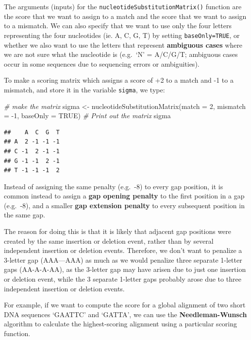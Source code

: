 \documentclass[
]{book}
\newenvironment{Shaded}{\begin{snugshade}}{\end{snugshade}}
\newcommand{\AttributeTok}[1]{\textcolor[rgb]{0.77,0.63,0.00}{#1}}
\newcommand{\CommentTok}[1]{\textcolor[rgb]{0.56,0.35,0.01}{\textit{#1}}}
\newcommand{\ConstantTok}[1]{\textcolor[rgb]{0.00,0.00,0.00}{#1}}
\newcommand{\DecValTok}[1]{\textcolor[rgb]{0.00,0.00,0.81}{#1}}
\newcommand{\FunctionTok}[1]{\textcolor[rgb]{0.00,0.00,0.00}{#1}}
\newcommand{\NormalTok}[1]{#1}
\newcommand{\OtherTok}[1]{\textcolor[rgb]{0.56,0.35,0.01}{#1}}
\newcommand{\SpecialCharTok}[1]{\textcolor[rgb]{0.00,0.00,0.00}{#1}}
\begin{document}
The arguments (inputs) for the \texttt{nucleotideSubstitutionMatrix()} function are the score that we want to assign to a match and the score that we want to assign to a mismatch. We can also specify that we want to use only the four letters representing the four nucleotides (ie. A, C, G, T) by setting \texttt{baseOnly=TRUE}, or whether we also want to use the letters that represent \textbf{ambiguous cases} where we are not sure what the nucleotide is (e.g.~`N' = A/C/G/T; ambiguous cases occur in some sequences due to sequencing errors or ambiguities).

To make a scoring matrix which assigns a score of +2 to a match and -1 to a mismatch, and store it in the variable \texttt{sigma}, we type:

\begin{Shaded}
\begin{Highlighting}[]
\CommentTok{\# make the matrix}
\NormalTok{sigma }\OtherTok{\textless{}{-}} \FunctionTok{nucleotideSubstitutionMatrix}\NormalTok{(}\AttributeTok{match =} \DecValTok{2}\NormalTok{, }
                                      \AttributeTok{mismatch =} \SpecialCharTok{{-}}\DecValTok{1}\NormalTok{, }
                                      \AttributeTok{baseOnly =} \ConstantTok{TRUE}\NormalTok{)}
\CommentTok{\# Print out the matrix}
\NormalTok{sigma }
\end{Highlighting}
\end{Shaded}

\begin{verbatim}
##    A  C  G  T
## A  2 -1 -1 -1
## C -1  2 -1 -1
## G -1 -1  2 -1
## T -1 -1 -1  2
\end{verbatim}

Instead of assigning the same penalty (e.g.~-8) to every gap position, it is common instead to assign a \textbf{gap opening penalty} to the first position in a gap (e.g.~-8), and a smaller \textbf{gap extension penalty} to every subsequent position in the same gap.

The reason for doing this is that it is likely that adjacent gap positions were created by the same insertion or deletion event, rather than by several independent insertion or deletion events. Therefore, we don't want to penalize a 3-letter gap (AAA---AAA) as much as we would penalize three separate 1-letter gaps (AA-A-A-AA), as the 3-letter gap may have arisen due to just one insertion or deletion event, while the 3 separate 1-letter gaps probably arose due to three independent insertion or deletion events.

For example, if we want to compute the score for a global alignment of two short DNA sequences `GAATTC' and `GATTA', we can use the \textbf{Needleman-Wunsch} algorithm to calculate the highest-scoring alignment using a particular scoring function.
\end{document}

